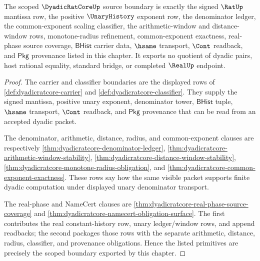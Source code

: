 \begin{theorem}
\label{thm:dyadicratcore-scoped-source-boundary}
The scoped $\DyadicRatCoreUp$ source boundary is exactly the signed $\RatUp$
mantissa row, the positive $\UnaryHistory$ exponent row, the denominator
ledger, the common-exponent scaling classifier, the arithmetic-window and
distance-window rows, monotone-radius refinement, common-exponent exactness,
real-phase source coverage, $\mathsf{BHist}$ carrier data, $\hsame$
transport, $\Cont$ readback, and $\mathsf{Pkg}$ provenance listed in this
chapter. It exports no quotient of dyadic pairs, host rational equality,
standard bridge, or completed $\RealUp$ endpoint.
\end{theorem}
\begin{proof}
The carrier and classifier boundaries are the displayed rows of
\autoref{def:dyadicratcore-carrier} and
\autoref{def:dyadicratcore-classifier}. They supply the signed mantissa,
positive unary exponent, denominator tower, $\mathsf{BHist}$ tuple, $\hsame$
transport, $\Cont$ readback, and $\mathsf{Pkg}$ provenance that can be read
from an accepted dyadic packet.

The denominator, arithmetic, distance, radius, and common-exponent clauses are
respectively \autoref{thm:dyadicratcore-denominator-ledger},
\autoref{thm:dyadicratcore-arithmetic-window-stability},
\autoref{thm:dyadicratcore-distance-window-stability},
\autoref{thm:dyadicratcore-monotone-radius-obligation}, and
\autoref{thm:dyadicratcore-common-exponent-exactness}. These rows say how the
same visible packet supports finite dyadic computation under displayed unary
denominator transport.

The real-phase and NameCert clauses are
\autoref{thm:dyadicratcore-real-phase-source-coverage} and
\autoref{thm:dyadicratcore-namecert-obligation-surface}. The first contributes
the real constant-history row, unary ledger/window rows, and append readbacks;
the second packages those rows with the separate arithmetic, distance, radius,
classifier, and provenance obligations. Hence the listed primitives are
precisely the scoped boundary exported by this chapter.
\end{proof}

